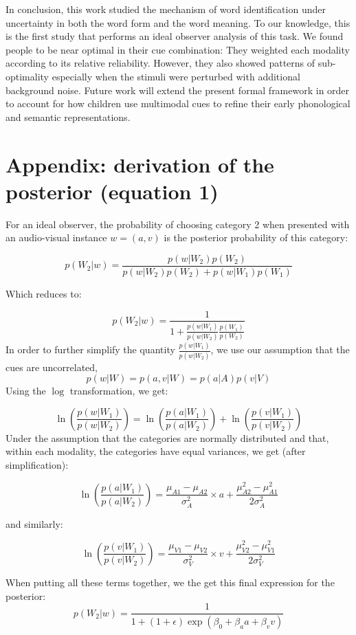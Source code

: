 \documentclass[english,man]{apa6}
\theoremstyle{definition}
\theoremstyle{definition}
\theoremstyle{definition}
\theoremstyle{remark}
\begin{document}
In conclusion, this work studied the mechanism of word identification
under uncertainty in both the word form and the word meaning. To our
knowledge, this is the first study that performs an ideal observer
analysis of this task. We found people to be near optimal in their cue
combination: They weighted each modality according to its relative
reliability. However, they also showed patterns of sub-optimality
especially when the stimuli were perturbed with additional background
noise. Future work will extend the present formal framework in order to
account for how children use multimodal cues to refine their early
phonological and semantic representations.

\section{Appendix: derivation of the posterior (equation
1)}\label{appendix-derivation-of-the-posterior-equation-1}

For an ideal observer, the probability of choosing category 2 when
presented with an audio-visual instance \(w = (a, v)\) is the posterior
probability of this category:

\[p(W_2 | w)=\frac{p(w|W_2)p(W_2)}{p(w|W_2)p(W_2)+p(w|W_1)p(W_1)}\]

Which reduces to:

\[p(W_2 | w)=\frac{1}{1+\frac{p(w|W_1)}{p(w|W_2)} \frac{p(W_1)}{p(W_2)}}\]
In order to further simplify the quantity \(\frac{p(w|W_1)}{p(w|W_2)}\),
we use our assumption that the cues are uncorrelated,
\[p(w | W) = p(a,v| W) = p(a| A)p(v| V)\] Using the \(\log\)
transformation, we get:

\[ \ln(\frac{p(w |W_1)}{p(w|W_2)})=\ln(\frac{p(a|W_1)}{p(a|W_2)})+\ln(\frac{p(v|W_1)}{p(v|W_2)}) \]
Under the assumption that the categories are normally distributed and
that, within each modality, the categories have equal variances, we get
(after simplification):

\[\ln(\frac{p(a|W_1)}{p(a|W_2)})=\frac{\mu_{A1}-\mu_{A2}}{\sigma^2_{A}}\times a+ \frac{\mu^2_{A2}-\mu^2_{A1}}{2\sigma^2_{A}}\]

and similarly:

\[\ln(\frac{p(v|W_1)}{p(v|W_2)})=\frac{\mu_{V1}-\mu_{V2}}{\sigma^2_{V}}\times v+ \frac{\mu^2_{V2}-\mu^2_{V1}}{2\sigma^2_{V}}\]

When putting all these terms together, we the get this final expression
for the posterior:
\[p(W_2 | w)=\frac{1}{1+(1+\epsilon)\exp(\beta_0+\beta_aa+\beta_vv)}\]
\end{document}
